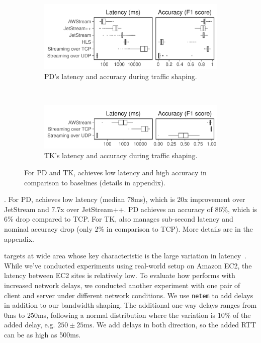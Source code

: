 \begin{figure}[t]
  \begin{subfigure}[t]{\columnwidth}
    \centering
    \includegraphics[width=\columnwidth]{figures/runtime_mot-boxplot.pdf}
    \caption{PD's latency and accuracy during traffic shaping.}
    \label{fig:pd-runtime-boxplot}
  \end{subfigure}
  \\
  \begin{subfigure}[t]{\columnwidth}
    \centering
    \includegraphics[width=\columnwidth]{figures/runtime_tk-boxplot2.pdf}
    \caption{TK's latency and accuracy during traffic shaping.}
    \label{fig:tk-runtime-boxplot}
  \end{subfigure}
  \caption{For PD and TK, \sysname{} achieves low latency and high accuracy in
    comparison to baselines (details in appendix).}
  \label{fig:pd-tk}
\end{figure}

. For PD,
\sysname{} achieves low latency (median 78ms), which is 20x improvement over
JetStream and 7.7x over JetStream++. PD achieves an accuracy of 86\%, which is
6\% drop compared to TCP. For TK, \sysname{} also manages sub-second latency and
nominal accuracy drop (only 2\% in comparison to TCP). More details are in the
appendix.

 \sysname{} targets at wide area
whose key characteristic is the large variation in
latency~\cite{li2010cloudcmp}. While we've conducted experiments using
real-world setup on Amazon EC2, the latency between EC2 sites is relatively low.
To evaluate how \sysname{} performs with increased network delays, we conducted
another experiment with one pair of client and server under different network
conditions. We use \texttt{netem} to add delays in addition to our bandwidth
shaping. The additional one-way delays ranges from 0ms to 250ms, following a
normal distribution where the variation is 10\% of the added delay, e.g.
$250\pm 25\text{ms}$. We add delays in both direction, so the added RTT can be
as high as 500ms.

